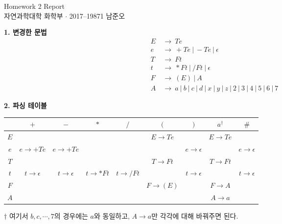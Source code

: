 \documentclass[12pt]{article}
\begin{document}
\begin{center}
	\LARGE \textsf{Homework 2 Report}\\
	\large \textsf{자연과학대학 화학부 $\cdot$ 2017--19871 남준오}\\
	\normalsize
	\vspace{1cm}
\end{center}

\noindent\textbf{1. 변경한 문법}
\begin{align*}
	E & ~\rightarrow~ Te \\
	e & ~\rightarrow~ +Te ~|~ -Te ~|~ \epsilon \\
	T & ~\rightarrow~ Ft \\
	t & ~\rightarrow~ *Ft ~|~ /Ft ~|~ \epsilon \\
	F & ~\rightarrow~ (E) ~|~ A \\
	A & ~\rightarrow~ a ~|~ b ~|~ c ~|~ d ~|~ x ~|~ y ~|~ z ~|~ 2 ~|~ 3 ~|~ 4 ~|~ 5 ~|~ 6 ~|~ 7
\end{align*}

\noindent\textbf{2. 파싱 테이블}

\begin{table}[!htbp]
	\begin{center}
	\renewcommand{\arraystretch}{1.2}
	\begin{tabular}{|c|c|c|c|c|c|c|c|c|}
		\hline
		{} & $+$ & $-$ & $*$ & $/$ & $($ & $)$ & $a^\dagger$ & $\#$ \\ \hline
		$E$ & & & & & $E \rightarrow Te$ & & $E \rightarrow Te$ & \\
		$e$ & $e \rightarrow +Te$ & $e \rightarrow +Te$ & & & & $e \rightarrow \epsilon$ & & $e \rightarrow \epsilon$ \\
		$T$ & & & & & $T \rightarrow Ft$ & & $T \rightarrow Ft$ & \\
		$t$ & $t \rightarrow \epsilon$ & $t \rightarrow \epsilon$ & $t \rightarrow *Ft$ & $t \rightarrow /Ft$ & & $t \rightarrow \epsilon$ & & $t \rightarrow \epsilon$\\
		$F$ & & & & & $F \rightarrow (E)$ & & $F \rightarrow A$ & \\
		$A$ & & & & & & & $A \rightarrow a$ & \\
		\hline
	\end{tabular}
	\end{center}
	$\dagger$ 여기서 $b, c, \cdots, 7$의 경우에는 $a$와 동일하고, $A \to a$만 각각에 대해 바꿔주면 된다.
\end{table}
\vspace{0.5cm}
\end{document}
